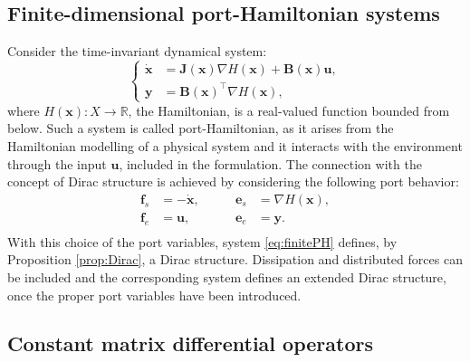 \subsection{Finite-dimensional port-Hamiltonian systems}
Consider the time-invariant dynamical system:
\begin{equation}
\label{eq:finitePH}
\begin{cases}
\dot{ \mathbf{x} } &= \mathbf{J}(\mathbf{x}) \nabla H(\mathbf{x}) + \mathbf{B}(\mathbf{x})\mathbf{u}, \\
\mathbf{y} &= \mathbf{B}(\mathbf{x})^\top \nabla H(\mathbf{x}),
\end{cases}
\end{equation}
where $ H(\mathbf{x}) : X \rightarrow \mathbb{R} $, the Hamiltonian, is a real-valued function bounded from below. Such a system is called port-Hamiltonian, as it arises from the Hamiltonian modelling of a physical system and it interacts with the environment through the input $\mathbf{u}$, included in the formulation. The connection with the concept of Dirac structure is achieved by considering the following port behavior:
\begin{equation}
\begin{aligned}
\mathbf{f}_s &= - \dot{\mathbf{x}}, \qquad 
&\mathbf{e}_s &= \nabla{H}(\mathbf{x}), \\
\mathbf{f}_e &= \mathbf{u}, \qquad
&\mathbf{e}_e &= \mathbf{y}. \\
\end{aligned}
\end{equation}
With this choice of the port variables, system \eqref{eq:finitePH} defines, by Proposition \ref{prop:Dirac}, a Dirac structure. Dissipation and distributed forces can be included and the corresponding system defines an extended Dirac structure, once the proper port variables have been introduced.

\subsection{Constant matrix differential operators}

